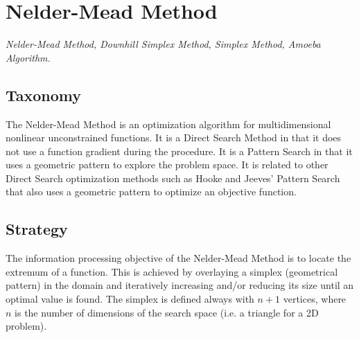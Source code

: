 

\section{Nelder-Mead Method} 
\label{sec:neldermead}

\emph{Nelder-Mead Method, Downhill Simplex Method, Simplex Method, Amoeba Algorithm.}

\subsection{Taxonomy}
The Nelder-Mead Method is an optimization algorithm for multidimensional nonlinear unconstrained functions.
It is a Direct Search Method in that it does not use a function gradient during the procedure. It is a Pattern Search in that it uses a geometric pattern to explore the problem space.
It is related to other Direct Search optimization methods such as Hooke and Jeeves' Pattern Search that also uses a geometric pattern to optimize an objective function.

\subsection{Strategy}
The information processing objective of the Nelder-Mead Method is to locate the extremum of a function.
This is achieved by overlaying a simplex (geometrical pattern) in the domain and iteratively increasing and/or reducing its size until an optimal value is found. The simplex is defined always with $n+1$ vertices, where $n$ is the number of dimensions of the search space (i.e. a triangle for a 2D problem).

